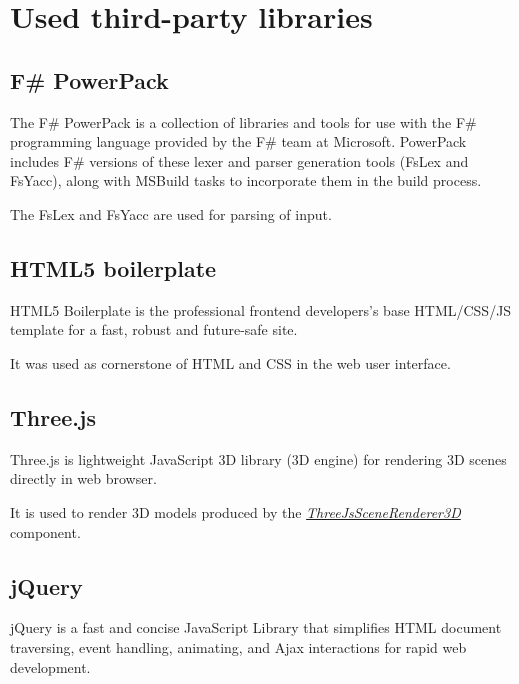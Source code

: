 
\chapter{Used third-party libraries}
\label{chap:thirdParty}

\section{F\# PowerPack}
\label{sec:FSharpPowerPack}

\noindent
The F\# PowerPack is a collection of libraries and tools for use with the F\# programming language provided by the F\# team at Microsoft.
PowerPack includes F\# versions of these lexer and parser generation tools (FsLex and FsYacc), along with MSBuild tasks to incorporate them in the build process.

The FsLex and FsYacc are used for parsing of input.


\section{HTML5 boilerplate}
\label{sec:HTML5boilerplate}

\noindent
HTML5 Boilerplate is the professional frontend developers's base HTML/CSS/JS template for a fast, robust and future-safe site.

It was used as cornerstone of HTML and CSS in the web user interface.


\section{Three.js}
\label{sec:ThreeJs}

\noindent
Three.js is lightweight JavaScript 3D library (3D engine) for rendering 3D scenes directly in web browser.

It is used to render 3D models produced by the \hyperref[Malsys.Processing.Components.Renderers.ThreeJsSceneRenderer3D]{\emph{ThreeJsSceneRenderer3D}} component.


\section{jQuery}
\label{sec:jQuery}

\noindent
jQuery is a fast and concise JavaScript Library that simplifies HTML document traversing, event handling, animating, and Ajax interactions for rapid web development.

